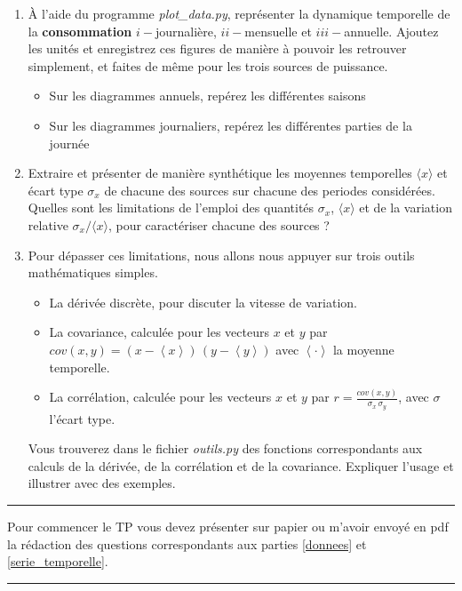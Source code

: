 \documentclass[12pt,a4,french]{article}
\newcommand{\tmtextbf}[1]{{\bfseries{#1}}}
\newcommand{\tmtextit}[1]{{\itshape{#1}}}
\begin{document}
\begin{enumerate}
	\item À l'aide du programme \tmtextit{plot\_data.py}, représenter la
	dynamique temporelle de la \tmtextbf{consommation} $i-$journalière, $ii-$mensuelle
	et $iii-$annuelle. Ajoutez les unités et enregistrez ces figures de manière à
	pouvoir les retrouver simplement, et faites de même pour les trois sources de puissance.
	\begin{itemize}
		\item Sur les diagrammes annuels, repérez les différentes saisons
		
		\item Sur les diagrammes journaliers, repérez les différentes parties de
		la journée
	\end{itemize}
	\item Extraire et présenter de manière synthétique les moyennes temporelles $\langle x \rangle$ et écart type $\sigma_x$ de chacune des sources sur chacune des periodes considérées. \newline
	Quelles sont les limitations de l'emploi des quantités $\sigma_x $, $ \langle
	x \rangle$ et de la variation relative $\sigma_x / \langle
	x \rangle$, pour caractériser chacune des sources ?
    \item Pour dépasser ces limitations, nous allons nous appuyer sur trois outils mathématiques simples. 
    \begin{itemize}
        \item La dérivée discrète, pour discuter la vitesse de variation.
        \item La covariance, calculée pour les vecteurs $x$ et $y$ par $cov(x,y)=(x-\left\langle x \right\rangle)\,(y-\left\langle y \right\rangle)$ avec $\left\langle \cdot \right\rangle$ la moyenne temporelle. 
        \item La corrélation, calculée pour les vecteurs $x$ et $y$ par $r=\frac{cov(x,y)}{\sigma_x \, \sigma_y}$, avec $\sigma$ l'écart type.
    \end{itemize}
    Vous trouverez dans le fichier \textit{outils.py} des fonctions correspondants aux calculs de la dérivée, de la corrélation et de la covariance. Expliquer l'usage et illustrer avec des exemples.
    
\end{enumerate}



\vspace{1cm}
\hrule
\vspace{0.5cm}
Pour commencer le TP vous devez présenter sur papier ou m'avoir envoyé en pdf la rédaction des questions correspondants aux parties \ref{donnees} et \ref{serie_temporelle}.
\vspace{0.5cm}
\hrule
\end{document}
